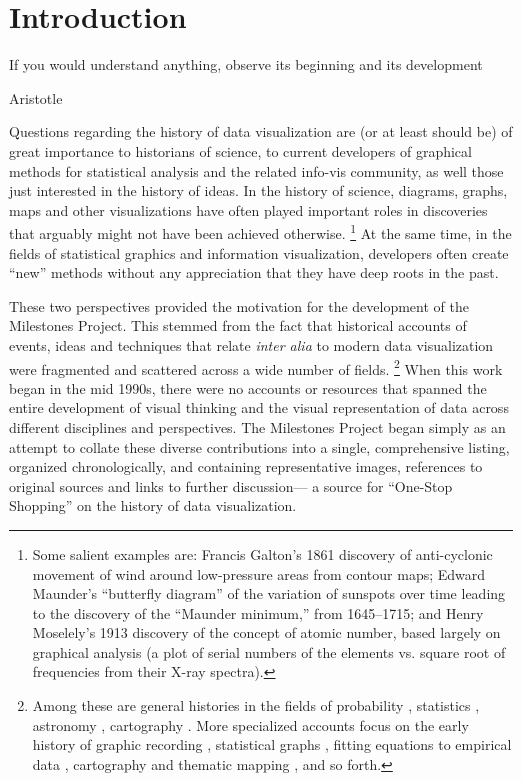 \section{Introduction}\label{sec:intro}
\epigraph{If you would understand anything, observe its beginning and its development}{Aristotle}

Questions regarding the history of data visualization are (or at least should be) of great importance to historians of science,
to current developers of graphical methods for statistical analysis and the related info-vis community, as well
those just interested in the history of ideas.
In the history of science, diagrams, graphs, maps and other visualizations have often played important roles in discoveries
that arguably might not have been achieved otherwise.%
\footnote{
	Some salient examples are:
	Francis Galton's 1861
	discovery of anti-cyclonic movement of wind around low-pressure areas from contour maps;
	Edward Maunder's ``butterfly diagram'' of the variation of sunspots over time leading to the
	discovery of the ``Maunder minimum,'' from 1645--1715;
	and Henry Moselely's 1913 discovery of the concept of atomic number,
	based largely on graphical analysis (a plot of serial numbers of the elements vs.
	square root of frequencies from their X-ray spectra).
}
At the same time,
in the fields of statistical graphics and information visualization,
developers often create ``new'' methods without any appreciation that they have deep roots in the past.


These two perspectives provided the motivation for the development of the Milestones Project.
This stemmed from the fact that historical accounts of events, ideas and techniques that
relate \emph{inter alia} to modern data visualization were fragmented and
scattered across a wide number of fields.%
\footnote{
Among these are general histories
in the fields of probability \citep{Hald:1990}, statistics
\citep{Pearson:1978,Porter:1986,Stigler:1986}, astronomy \citep{Riddell:1980}, cartography \citep{WallisRobinson:87}.
More specialized accounts focus on the early history of graphic recording
\citep{HoffGeddes:1959,HoffGeddes:1962}, statistical graphs
\citep{Funkhouser:1936,Funkhouser:1937,Royston:1970,Tilling:1975}, fitting equations to empirical data
\citep{Farebrother:1999}, cartography \citep{Friis:1974,Kruskal:1977} and thematic mapping
\citep{FriendlyPalsky:2007,Palsky:1996,Robinson:1982}, and so forth.
}
When this work began in the mid 1990s, there were no accounts or resources that spanned the entire development
of visual thinking and the visual representation of data across different disciplines and perspectives.
The Milestones Project began simply as an attempt to collate these diverse contributions into a single,
comprehensive listing, organized chronologically, and containing representative images, references to
original sources and links to further discussion--- a source for ``One-Stop Shopping'' on the history of
data visualization.

